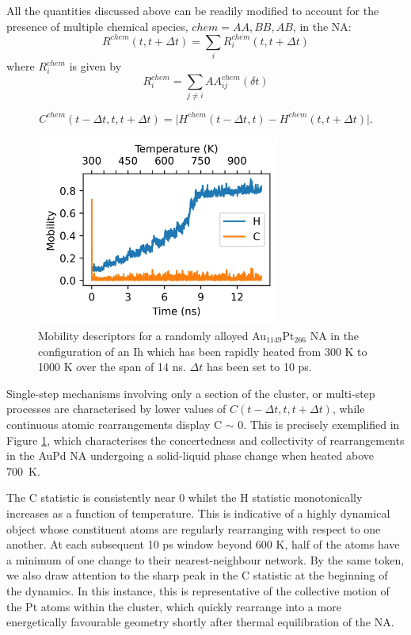 All the quantities discussed above can be readily modified to account for the presence of multiple
chemical species, $chem = AA, BB, AB$, in the NA:
\begin{equation}
R^{chem}(t, t + \Delta  t) = \sum_i R^{chem}_{i} (t, t + \Delta t) 
\end{equation}
where $R^{chem}_{i}$ is given by
\begin{equation}
R^{chem}_{i} = \sum_{j \ne i} AA_{ij}^{chem} (\delta t)
\end{equation}

\begin{equation}
    C^{chem} \left( t - \Delta t, t, t + \Delta t \right) = \vert H^{chem} \left( t - \Delta t, t \right) - H^{chem}\left( t, t + \Delta t \right) \vert .
\end{equation}

\begin{figure}[ht!]
    \centering
    \includegraphics[width = 8cm]{figures/Sapphire/Mobility.jpeg}
    \caption{Mobility descriptors for a randomly alloyed Au$_{1149}$Pt$_{266}$ NA in the configuration of an Ih which has been rapidly heated from 300 K to 1000 K over the span of 14 ns. $\Delta t$ has been set to 10 ps.}
    \label{fig:Mobility}
\end{figure}

Single-step mechanisms involving only a section of the cluster, or multi-step processes are characterised by lower values of $C\left(t  - \Delta t, t, t + \Delta t \right)$, while continuous atomic rearrangements display C $\sim$ 0. 
This is precisely exemplified in Figure \ref{fig:Mobility}, which characterises the concertedness and collectivity of rearrangements in the AuPd NA undergoing a solid-liquid phase change when heated above 700~K.

The C statistic is consistently near 0 whilst the H statistic monotonically increases as a function of temperature. 
This is indicative of a highly dynamical object whose constituent atoms are regularly rearranging with respect to one another.
At each subsequent 10 ps window beyond 600 K, half of the atoms have a minimum of one change to their nearest-neighbour network. 
By the same token, we also draw attention to the sharp peak in the C statistic at the beginning of the dynamics. 
%
In this instance, this is representative of the collective motion of the Pt atoms within the cluster, which quickly rearrange into a more energetically favourable geometry shortly after thermal equilibration of the NA.

